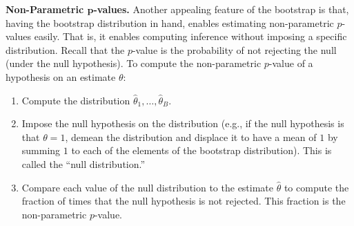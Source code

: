 \noindent \textbf{Non-Parametric $\bm{p}$-values.} Another appealing feature of the bootstrap is that, having the bootstrap distribution in hand, enables estimating non-parametric $p$-values easily. That is, it enables computing inference without imposing a specific distribution. Recall that the $p$-value is the probability of not rejecting the null (under the null hypothesis). To compute the non-parametric $p$-value of a hypothesis on an estimate $\theta$: 
\begin{enumerate}
	\item Compute the distribution $\hat{\theta}_1, \ldots, \hat{\theta}_B$. 
	\item Impose the null hypothesis on the distribution (e.g., if the null hypothesis is that $\theta = 1$, demean the distribution and displace it to have a mean of $1$ by summing $1$ to each of the elements of the bootstrap distribution). This is called the ``null distribution.''
	\item Compare each value of the null distribution to the estimate $\hat{\theta}$ to compute the fraction of times that the null hypothesis is not rejected. This fraction is the non-parametric $p$-value.  
\end{enumerate}








